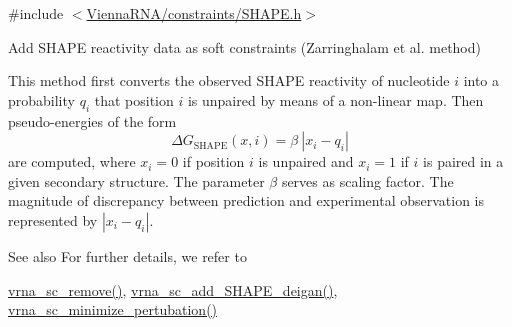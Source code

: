 {\ttfamily \#include $<$\mbox{\hyperlink{SHAPE_8h}{Vienna\+R\+N\+A/constraints/\+S\+H\+A\+P\+E.\+h}}$>$}



Add S\+H\+A\+PE reactivity data as soft constraints (Zarringhalam et al. method) 

This method first converts the observed S\+H\+A\+PE reactivity of nucleotide $ i $ into a probability $ q_i $ that position $ i $ is unpaired by means of a non-\/linear map. Then pseudo-\/energies of the form \[ \Delta G_{\text{SHAPE}}(x,i) = \beta\ |x_i - q_i| \] are computed, where $ x_i=0 $ if position $ i $ is unpaired and $ x_i=1 $ if $ i $ is paired in a given secondary structure. The parameter $ \beta $ serves as scaling factor. The magnitude of discrepancy between prediction and experimental observation is represented by $ |x_i - q_i| $.

\begin{DoxySeeAlso}{See also}
For further details, we refer to \cite{zarringhalam:2012} 

\mbox{\hyperlink{group__soft__constraints_ga73cdc07b9a199c614367bebef0f2c41a}{vrna\+\_\+sc\+\_\+remove()}}, \mbox{\hyperlink{group__SHAPE__reactivities_ga57d612b58e1c61dd6cfcb5a843f8f1b3}{vrna\+\_\+sc\+\_\+add\+\_\+\+S\+H\+A\+P\+E\+\_\+deigan()}}, \mbox{\hyperlink{group__perturbation_gaa124bdc20d88001c38ade590c4bcc3c4}{vrna\+\_\+sc\+\_\+minimize\+\_\+pertubation()}}
\end{DoxySeeAlso}

